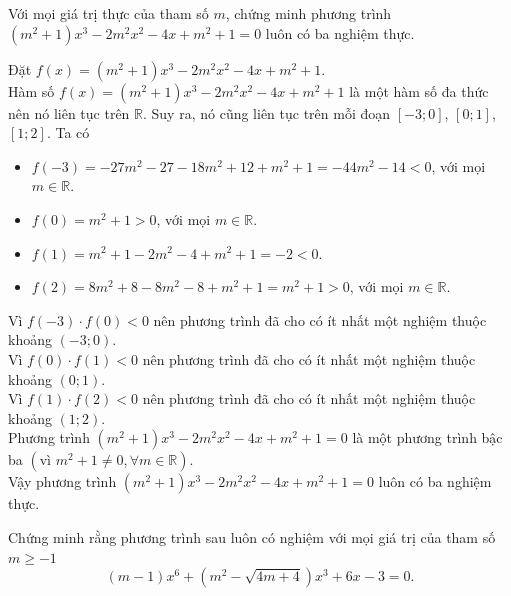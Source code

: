 \begin{vd}%
Với mọi giá trị thực của tham số $m$, chứng minh phương trình $\left(m^2+1\right)x^3-2m^2x^2-4x+m^2+1=0$ luôn có ba nghiệm thực.
\loigiai
{
Đặt $f(x)=\left(m^2+1\right)x^3-2m^2x^2-4x+m^2+1$.\\
Hàm số $f(x)=\left(m^2+1\right)x^3-2m^2x^2-4x+m^2+1$ là một hàm số đa thức nên nó liên tục trên $\mathbb{R}$. Suy ra, nó cũng liên tục trên mỗi đoạn $[-3;0]$, $[0;1]$, $[1;2]$.
Ta có
\begin{itemize}
\item $f(-3) =-27m^2-27-18m^2+12+m^2+1=-44m^2-14<0$, với mọi $m\in\mathbb{R}$.
\item $f(0)=m^2+1>0$, với mọi $m\in\mathbb{R}$.
\item $f(1)=m^2+1-2m^2-4+m^2+1=-2<0$.
\item $f(2)=8m^2+8-8m^2-8+m^2+1=m^2+1>0$, với mọi $m\in\mathbb{R}$.
\end{itemize}
Vì $f(-3)\cdot f(0)<0$ nên phương trình đã cho có ít nhất một nghiệm thuộc khoảng $(-3;0)$.\\
Vì $f(0)\cdot f(1)<0$ nên phương trình đã cho có ít nhất một nghiệm thuộc khoảng $(0;1)$.\\
Vì $f(1)\cdot f(2)<0$ nên phương trình đã cho có ít nhất một nghiệm thuộc khoảng $(1;2)$.\\
Phương trình $\left(m^2+1\right)x^3-2m^2x^2-4x+m^2+1=0$ là một phương trình bậc ba $(\text{vì } m^2+1\neq 0,\forall m\in\mathbb{R})$.\\
Vậy phương trình $\left(m^2+1\right)x^3-2m^2x^2-4x+m^2+1=0$ luôn có ba nghiệm thực.
}
\end{vd}
\begin{vd}%
	Chứng minh rằng phương trình sau luôn có nghiệm với mọi giá trị của tham số $m\ge -1$
	\[ (m-1)x^6+\left(m^2-\sqrt{4m+4}\right)x^3+6x-3=0. \]
\end{vd}
